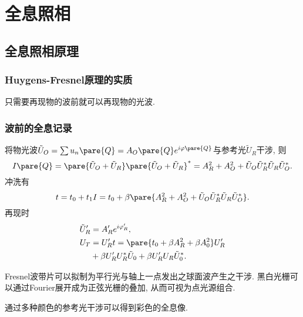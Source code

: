 \documentclass{ctexart}
\begin{document}
\section{全息照相} %
\label{sec:全息照相}

\subsection{全息照相原理} %
\label{sub:全息照相原理}

\subsubsection{Huygens-Fresnel原理的实质} %
\label{ssub:huygens_fresnel原理的实质}

只需要再现物的波前就可以再现物的光波.


\subsubsection{波前的全息记录} %
\label{ssub:波前的全息记录}

将物光波$\tilde{U}_O = \sum u_n\pare{Q} = A_O\pare{Q} e^{i\varphi\pare{Q}}$与参考光$\tilde{U}_R$干涉, 则
\[ I\pare{Q} = \pare{\tilde{U}_O + \tilde{U}_R}\pare{\tilde{U}_O + \tilde{U}_R}^* = A_R^2 + A_O^2 + \tilde{U}_O \tilde{U}_R^* \tilde{U}_R \tilde{U}_O ^*. \]
冲洗有
\[ t = t_0 + t_1 I = t_0 + \beta \pare{A_R^2 + A_O^2 + \tilde{U}_O \tilde{U}_R^* \tilde{U}_R \tilde{U}_O ^*}. \]
再现时
\begin{align*}
    \tilde{U}_R' &= A_R' e^{i\varphi_R'}, \\
    U_T &= U_R't = \pare{t_0 + \beta A_R^2 + \beta A_0^2} U_R' \\
    &+ \beta U_R' U_R^* \tilde{U}_0 + \beta U_R' U_R \tilde{U}_0^*.
\end{align*}
\begin{remark}
    Fresnel波带片可以拟制为平行光与轴上一点发出之球面波产生之干涉. 黑白光栅可以通过Fourier展开成为正弦光栅的叠加, 从而可视为点光源组合.
\end{remark}
\begin{remark}
    通过多种颜色的参考光干涉可以得到彩色的全息像.
\end{remark}



\end{document}
